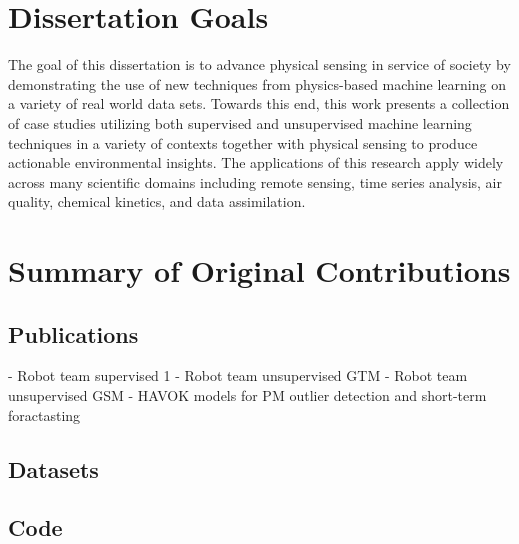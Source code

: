 


\section{Dissertation Goals}


The goal of this dissertation is to advance physical sensing in service of society by demonstrating the use of new techniques from physics-based machine learning on a variety of real world data sets. Towards this end, this work presents a collection of case studies utilizing both supervised and unsupervised machine learning techniques in a variety of contexts together with physical sensing to produce actionable environmental insights. The applications of this research apply widely across many scientific domains including remote sensing, time series analysis, air quality, chemical kinetics, and data assimilation.




\section{Summary of Original Contributions}

\subsection{Publications}
- Robot team supervised 1
- Robot team unsupervised GTM
- Robot team unsupervised GSM
- HAVOK models for PM outlier detection and short-term foractasting

\subsection{Datasets}
\subsection{Code}










